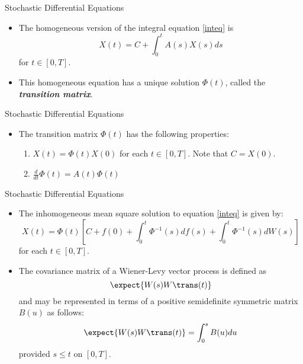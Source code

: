 \begin{frame}
Stochastic Differential Equations
 \begin{itemize}
 \item The homogeneous version of the integral equation
 \eqref{inteq} is
\begin{equation}\label{homointeq}
  X(t)=C+\int_0^tA(s)X(s)ds
\end{equation}
for $t\in [0,T]$.
\item This homogeneous equation has a unique solution $\Phi(t)$,
called the \textit{\textbf{transition matrix}}.
\end{itemize}
\end{frame}
\begin{frame}
Stochastic Differential Equations
 \begin{itemize}
 \item The transition matrix $\Phi(t)$ has the following properties:
 \begin{enumerate}
 \item $X(t)=\Phi(t)X(0)$ for each $t\in [0,T]$. Note that
 $C=X(0)$.
 \item $\frac{d}{dt}\Phi(t)=A(t)\Phi(t)$
 \end{enumerate}
\end{itemize}
\end{frame}
\begin{frame}
Stochastic Differential Equations
 \begin{itemize}
 \item The inhomogeneous mean square solution to equation \eqref{inteq} is
 given by:
\begin{equation}\label{inhomosol}
X(t)=\Phi(t)\left[ C+f(0)+\int_0^t\Phi^{-1}(s)df(s) +
\int_0^t\Phi^{-1}(s)dW(s) \right]
\end{equation}
for each $t\in [0,T]$.
\end{itemize}
\end{frame}
\begin{frame}
 \begin{itemize}
 \item The covariance matrix of a Wiener-Levy vector process is defined as
\begin{equation}\label{covmat}
  \expect{W(s)W\trans (t)}
\end{equation}
and may be represented in  terms of a positive semidefinite
symmetric matrix $B(u)$ as follows:
\begin{equation}\label{covmatrep}
  \expect{W(s)W\trans (t)} = \int_0^s B(u)du
\end{equation}
provided $s\leq t$ on $[0,T]$.
\end{itemize}
\end{frame}

